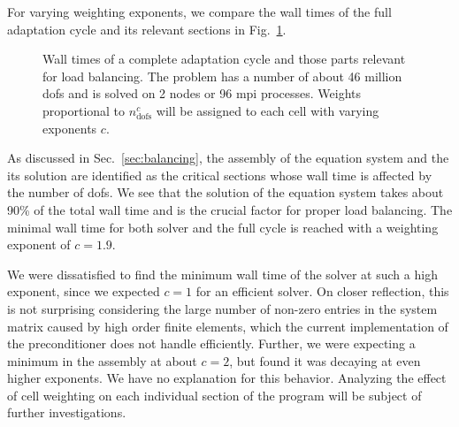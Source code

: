 For varying weighting exponents, we compare the wall times of the full adaptation cycle and its relevant sections
in Fig.~\ref{fig:weights}.

\begin{figure}
\centering

\caption[Wall times for load balancing with varying weighting exponents.]{Wall times of a complete adaptation cycle and those parts relevant for load balancing. The problem has a number of about 46 million \glspl{dof} and is solved on 2 nodes or 96 \gls{mpi} processes. Weights proportional to $n_\text{dofs}^c$ will be assigned to each cell with varying exponents $c$.}
\label{fig:weights}
\end{figure}

As discussed in Sec.~\ref{sec:balancing}, the assembly of the equation system and the its solution are identified as the critical sections whose wall time is affected by the number of \glspl{dof}. We see that the solution of the equation system takes about 90\% of the total wall time and is the crucial factor for proper load balancing. The minimal wall time for both solver and the full cycle is reached with a weighting exponent of $c = 1.9$.

We were dissatisfied to find the minimum wall time of the solver at such a high exponent, since we expected $c = 1$ for an efficient solver.
On closer reflection, this is not surprising considering the large number of non-zero entries in the system matrix caused by high order finite elements, which the current implementation of the preconditioner does not handle efficiently.
Further, we were expecting a minimum in the assembly at about $c = 2$, but found it was decaying at even higher exponents. We have no explanation for this behavior. Analyzing the effect of cell weighting on each individual section of the program
will be subject of further investigations.

